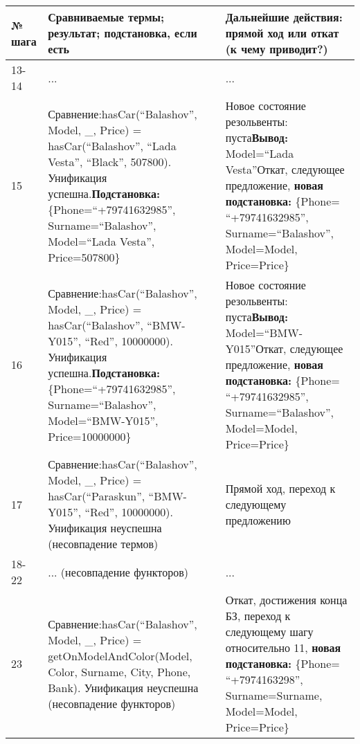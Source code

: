 \documentclass[14pt,a4paper]{scrreprt}
\begin{document}
\begin{table}[H]
	\begin{tabular}{|p{1.2cm\small}|p{9cm\small}|p{5cm\small}|}	
		\hline
		№ шага & Сравниваемые термы; результат; подстановка, если есть & Дальнейшие действия: прямой ход или откат (к чему приводит?)\\
		\hline
		13-14 & ... & ...\\
		\hline
		15 & Сравнение:\linebreak hasCar(``Balashov'', Model, \_, Price) = hasCar(``Balashov'', ``Lada Vesta'', ``Black'', 507800). Унификация успешна.\linebreak \textbf{Подстановка:} \{Phone=``+79741632985'', Surname=``Balashov'', Model=``Lada Vesta'', Price=507800\} & Новое состояние резольвенты: пуста\linebreak \textbf{Вывод:} Model=``Lada Vesta''\linebreak Откат, следующее предложение, \textbf{новая подстановка:} \{Phone= ``+79741632985'', Surname=``Balashov'', Model=Model, Price=Price\}\\
		\hline
		16 & Сравнение:\linebreak hasCar(``Balashov'', Model, \_, Price) = hasCar(``Balashov'', ``BMW-Y015'', ``Red'', 10000000). Унификация успешна.\linebreak \textbf{Подстановка:} \{Phone=``+79741632985'', Surname=``Balashov'', Model=``BMW-Y015'', Price=10000000\} & Новое состояние резольвенты: пуста\linebreak \textbf{Вывод:} Model=``BMW-Y015''\linebreak Откат, следующее предложение, \textbf{новая подстановка:} \{Phone= ``+79741632985'', Surname=``Balashov'', Model=Model, Price=Price\}\\
		\hline
		17 & Сравнение:\linebreak hasCar(``Balashov'', Model, \_, Price) = hasCar(``Paraskun'', ``BMW-Y015'', ``Red'', 10000000). Унификация неуспешна (несовпадение термов) & Прямой ход, переход к следующему предложению\\
		\hline
		18-22 & ... (несовпадение функторов) & ...\\
		\hline
		23 & Сравнение:\linebreak hasCar(``Balashov'', Model, \_, Price) = getOnModelAndColor(Model, Color, Surname, City, Phone, Bank). Унификация неуспешна (несовпадение функторов) & Откат, достижения конца БЗ, переход к следующему шагу относительно 11, \textbf{новая подстановка:} \{Phone= ``+7974163298'', Surname=Surname, Model=Model, Price=Price\}\\
		\hline
	\end{tabular}
\end{table}
\end{document}
